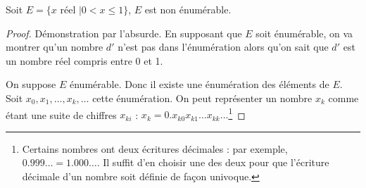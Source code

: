 \begin{mytheo}
	Soit $E = \{ x \text{ réel }| 0<x\leq1\}$, $E$ est non énumérable.

	\begin{proof}
		Démonstration par l'absurde.  En supposant que $E$ soit énumérable, on va montrer qu'un nombre $d'$ n'est pas dans l'énumération alors qu'on sait
		que $d'$ est un nombre réel compris entre 0 et 1.
		
		On suppose $E$ énumérable. Donc il existe une énumération des éléments de $E$.  Soit 
		$x_0, x_1,\dots,x_k,\dots$ cette énumération. On peut représenter un nombre $x_k$ comme étant une
		suite de chiffres $x_{ki}$ : $x_k = 0.x_{k0}x_{k1}\dots x_{kk}\dots$\footnote{Certains nombres ont deux écritures décimales : par exemple, $0.999\ldots = 1.000\ldots$. Il suffit d'en choisir une des deux pour que l'écriture décimale d'un nombre soit définie de façon univoque.}
		

\end{proof}
\end{mytheo}
